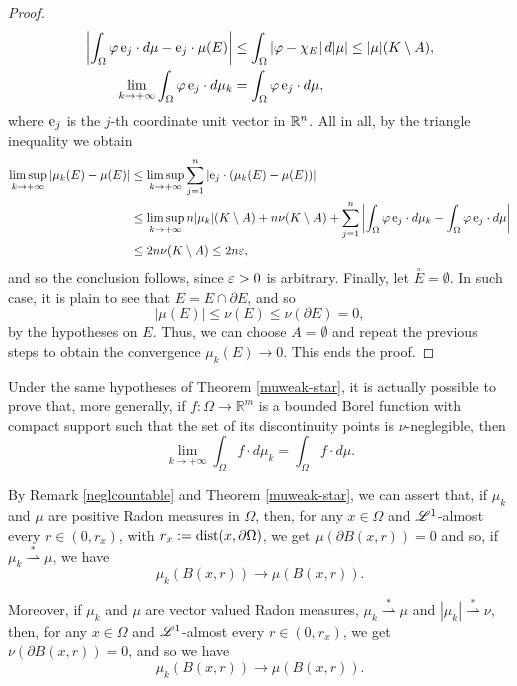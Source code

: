 \begin{proof}
\begin{align*}
\left | \int_{\Omega} \varphi \, {\rm e}_{j} \cdot d \mu - {\rm e}_{j} \cdot\mu(E) \right | & \le \int_{\Omega} |\varphi - \chi_{E}| \, d |\mu| \le |\mu|(K \setminus A), \\
\lim_{k \to + \infty} \int_{\Omega} \varphi \, {\rm e}_{j} \cdot d \mu_{k} & = \int_{\Omega} \varphi \, {\rm e}_{j} \cdot d \mu,
\end{align*}
where ${\rm e}_{j}$ is the $j$-th coordinate unit vector in $\mathbb{R}^{n}$. All in all, by the triangle inequality we obtain
\begin{align*}
\limsup_{k \to + \infty} |\mu_{k}(E) - \mu(E)| & \le \limsup_{k \to + \infty} \sum_{j = 1}^{n} |{\rm e}_{j} \cdot (\mu_{k}(E) - \mu(E))| \\
& \le \limsup_{k \to + \infty} n |\mu_{k}|(K \setminus A) + n \nu(K \setminus A) + \sum_{j = 1}^{n} \left | \int_{\Omega} \varphi \, {\rm e}_{j} \cdot d \mu_{k} - \int_{\Omega} \varphi \, {\rm e}_{j} \cdot d \mu \right | \\
& \le 2 n \nu(K \setminus A) \le 2 n \varepsilon,
\end{align*}
and so the conclusion follows, since $\varepsilon > 0$ is arbitrary. Finally, let $\overset{\circ}E = \emptyset$. In such case, it is plain to see that $E = E \cap \partial E$, and so $$|\mu(E)| \le \nu(E) \le \nu(\partial E) = 0,$$
by the hypotheses on $E$. Thus, we can choose $A = \emptyset$ and repeat the previous steps to obtain the convergence $\mu_{k}(E) \to 0$. This ends the proof.
\end{proof}

\begin{remark}
Under the same hypotheses of Theorem \ref{muweak-star}, it is actually possible to prove that, more generally, if $f : \Omega \to \mathbb{R}^{m}$ is a bounded Borel function with compact support such that the set of its discontinuity points is $\nu$-neglegible, then
\[ \lim_{k \to +\infty} \int_{\Omega} f \cdot d\mu_{k} = \int_{\Omega} f \cdot d\mu.  \]
\end{remark}

\begin{remark} By Remark \ref{neglcountable} and Theorem \ref{muweak-star}, we can assert that, if $\mu_{k}$ and $\mu$ are positive Radon measures in $\Omega$, then, for any $x \in \Omega$ and $\mathscr{L}^{1}$-almost every $r \in (0, r_{x})$, with $r_{x} := {\rm dist}(x, \partial \Omega)$, we get $\mu(\partial B(x,r)) = 0$ and so, if $\mu_{k} \stackrel {*} {\rightharpoonup} \mu$, we have $$\mu_{k}(B(x,r)) \to \mu(B(x,r)).$$

Moreover, if $\mu_{k}$ and $\mu$ are vector valued Radon measures, $\mu_{k} \stackrel {*}{\rightharpoonup} \mu$ and $|\mu_{k}| \stackrel {*} {\rightharpoonup} \nu$, then, for any $x \in \Omega$ and $\mathscr{L}^{1}$-almost every $r \in (0, r_{x})$, we get $\nu(\partial B(x,r)) = 0$, and so we have $$\mu_{k}(B(x,r)) \to \mu(B(x,r)).$$
\end{remark}


